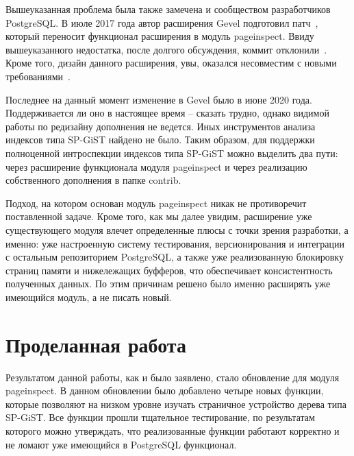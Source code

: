 \documentclass[12pt,oneside]{amsart}
\begin{document}
Вышеуказанная проблема была также замечена и сообществом разработчиков PostgreSQL. В июле 2017 года автор расширения Gevel подготовил патч~\cite{patch}, который переносит функционал расширения в модуль pageinspect. Ввиду вышеуказанного недостатка, после долгого обсуждения, коммит отклонили~\cite{patchDeny}. Кроме того, дизайн данного расширения, увы, оказался несовместим с новыми требованиями~\cite{patchArch}.

Последнее на данный момент изменение в Gevel было в июне 2020 года. Поддерживается ли оно в настоящее время -- сказать трудно, однако видимой работы по редизайну дополнения не ведется. Иных инструментов анализа индексов типа SP-GiST найдено не было. Таким образом, для поддержки полноценной интроспекции индексов типа SP-GiST можно выделить два пути: через расширение функционала модуля pageinspect и через реализацию собственного дополнения в папке contrib.

Подход, на котором основан модуль pageinspect никак не противоречит поставленной задаче. Кроме того, как мы далее увидим, расширение уже существующего модуля влечет определенные плюсы с точки зрения разработки, а именно: уже настроенную систему тестирования, версионирования и интеграции с остальным репозиторием PostgreSQL, а также уже реализованную блокировку страниц памяти и нижележащих буфферов, что обеспечивает консистентность полученных данных. По этим причинам решено было именно расширять уже имеющийся модуль, а не писать новый.



\section{Проделанная работа}

Результатом данной работы, как и было заявлено, стало обновление для модуля pageinspect. В данном обновлении было добавлено четыре новых функции, которые позволяют на низком уровне изучать страничное устройство дерева типа SP-GiST. Все функции прошли тщательное тестирование, по результатам которого можно утверждать, что реализованные функции работают корректно и не ломают уже имеющийся в PostgreSQL функционал.
\end{document}
